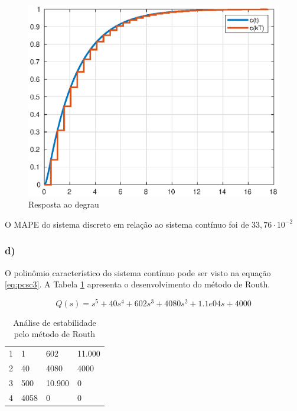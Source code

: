     \begin{figure}[!ht]
        \centering
        \includegraphics[width = 0.75\linewidth]{Figuras/ProblemasPI/Problema3/stepdiscreto.eps}
        \caption{Resposta ao degrau}
        \label{fig:Stepctd3}                   
    \end{figure}

    O MAPE do sistema discreto em relação ao sistema contínuo foi de $33,76 \cdot 10^{-2}$

\subsubsection*{d)}


    O polinômio característico do sistema contínuo pode ser visto na equação \ref{eq:pcsc3}. A Tabela 
    \ref{tab:RE3} apresenta o desenvolvimento do método de Routh. 

    \begin{equation}
        Q(s) = s^5 + 40 s^4 + 602 s^3 + 4080 s^2 + 1.1e04 s + 4000
        \label{eq:pcsc3}
    \end{equation}

    \begin{table}[!ht]
        \centering
        \vspace{0.5cm}
        \caption{Análise de estabilidade pelo método de Routh} 
        \begin{tabular}{r|lll}
            1 & 1 & 602 & 11.000 \\
            2 & 40 & 4080 & 4000 \\
            3 & 500 & 10.900 & 0\\
            4 & 4058 & 0 & 0
        \end{tabular}                
        \label{tab:RE3}
    \end{table}

